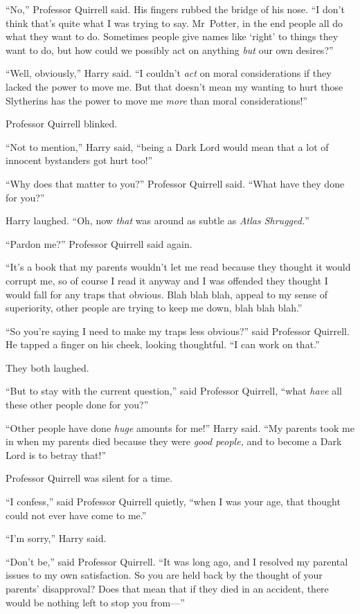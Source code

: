 “No,” Professor Quirrell said. His fingers rubbed the bridge of his nose. “I don’t think that’s quite what I was trying to say. Mr~Potter, in the end people all do what they want to do. Sometimes people give names like ‘right’ to things they want to do, but how could we possibly act on anything \emph{but} our own desires?”

“Well, obviously,” Harry said. “I couldn’t \emph{act} on moral considerations if they lacked the power to move me. But that doesn’t mean my wanting to hurt those Slytherins has the power to move me \emph{more} than moral considerations!”

Professor Quirrell blinked.

“Not to mention,” Harry said, “being a Dark Lord would mean that a lot of innocent bystanders got hurt too!”

“Why does that matter to you?” Professor Quirrell said. “What have they done for you?”

Harry laughed. “Oh, now \emph{that} was around as subtle as \emph{Atlas Shrugged.}”

“Pardon me?” Professor Quirrell said again.

“It’s a book that my parents wouldn’t let me read because they thought it would corrupt me, so of course I read it anyway and I was offended they thought I would fall for any traps that obvious. Blah blah blah, appeal to my sense of superiority, other people are trying to keep me down, blah blah blah.”

“So you’re saying I need to make my traps less obvious?” said Professor Quirrell. He tapped a finger on his cheek, looking thoughtful. “I can work on that.”

They both laughed.

“But to stay with the current question,” said Professor Quirrell, “what \emph{have} all these other people done for you?”

“Other people have done \emph{huge} amounts for me!” Harry said. “My parents took me in when my parents died because they were \emph{good people,} and to become a Dark Lord is to betray that!”

Professor Quirrell was silent for a time.

“I confess,” said Professor Quirrell quietly, “when I was your age, that thought could not ever have come to me.”

“I’m sorry,” Harry said.

“Don’t be,” said Professor Quirrell. “It was long ago, and I resolved my parental issues to my own satisfaction. So you are held back by the thought of your parents’ disapproval? Does that mean that if they died in an accident, there would be nothing left to stop you from—”

